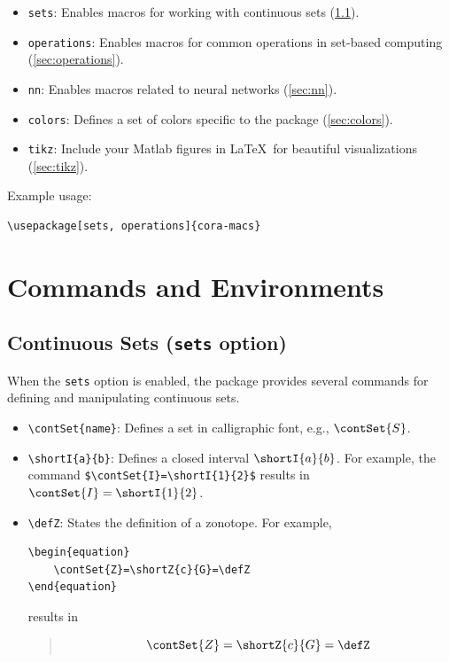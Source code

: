 \documentclass{article}
\begin{document}
\begin{itemize}
  \item \texttt{sets}: Enables macros for working with continuous sets (\cref{sec:sets}).
  \item \texttt{operations}: Enables macros for common operations in set-based computing (\cref{sec:operations}).
  \item \texttt{nn}: Enables macros related to neural networks (\cref{sec:nn}).
  \item \texttt{colors}: Defines a set of colors specific to the \texttt{\CORAMACSname} package (\cref{sec:colors}).
  \item \texttt{tikz}: Include your Matlab figures in \LaTeX\ for beautiful visualizations (\cref{sec:tikz}).
\end{itemize}

\noindent
Example usage:
\begin{verbatim}
\usepackage[sets, operations]{cora-macs}
\end{verbatim}


\section{Commands and Environments}

\subsection{Continuous Sets (\texttt{sets} option)} \label{sec:sets}
When the \texttt{sets} option is enabled, the package provides several commands for defining and manipulating continuous sets.

\begin{itemize}
  \item \verb|\contSet{name}|: Defines a set in calligraphic font, e.g., $\contSet{S}$.
  \item \verb|\shortI{a}{b}|: Defines a closed interval $\shortI{a}{b}$. For example, the command \verb|$\contSet{I}=\shortI{1}{2}$| results in $\contSet{I}=\shortI{1}{2}$.
  \item \verb|\defZ|: States the definition of a zonotope. For example,
        \begin{verbatim}
\begin{equation}
    \contSet{Z}=\shortZ{c}{G}=\defZ
\end{equation}
\end{verbatim}
        \vspace{-2\baselineskip}
        results in
        \begin{quote}
          \begin{equation}
            \contSet{Z}=\shortZ{c}{G}=\defZ
          \end{equation}
        \end{quote}
\end{itemize}
\end{document}

